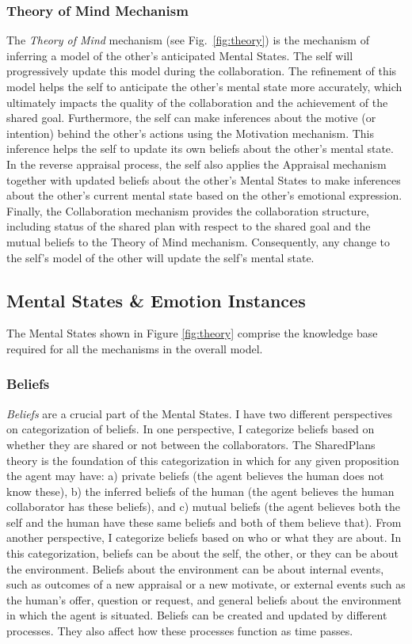 \subsubsection{Theory of Mind Mechanism}

The \textit{Theory of Mind} mechanism (see Fig.~\ref{fig:theory}) is the
mechanism of inferring a model of the other's anticipated Mental States. The
self will progressively update this model during the collaboration. The
refinement of this model helps the self to anticipate the other's mental state
more accurately, which ultimately impacts the quality of the collaboration and
the achievement of the shared goal. Furthermore, the self can make inferences
about the motive (or intention) behind the other's actions using the Motivation
mechanism. This inference helps the self to update its own beliefs about the
other's mental state. In the reverse appraisal process, the self also applies
the Appraisal mechanism together with updated beliefs about the other's Mental
States to make inferences about the other's current mental state based on the
other's emotional expression. Finally, the Collaboration mechanism provides the
collaboration structure, including status of the shared plan with respect to the
shared goal and the mutual beliefs to the Theory of Mind mechanism.
Consequently, any change to the self's model of the other will update the self's
mental state.

\subsection{Mental States \& Emotion Instances}

The Mental States shown in Figure \ref{fig:theory} comprise the knowledge base
required for all the mechanisms in the overall model.

\subsubsection{Beliefs}

\textit{Beliefs} are a crucial part of the Mental States. I have two different
perspectives on categorization of beliefs. In one perspective, I categorize
beliefs based on whether they are shared or not between the collaborators. The
SharedPlans \cite{grosz:plans-discourse} theory is the foundation of this
categorization in which for any given proposition the agent may have: a) private
beliefs (the agent believes the human does not know these), b) the inferred
beliefs of the human (the agent believes the human collaborator has these
beliefs), and c) mutual beliefs (the agent believes both the self and the human
have these same beliefs and both of them believe that). From another
perspective, I categorize beliefs based on who or what they are about. In this
categorization, beliefs can be about the self, the other, or they can be about
the environment. Beliefs about the environment can be about internal events,
such as outcomes of a new appraisal or a new motivate, or external events such
as the human's offer, question or request, and general beliefs about the
environment in which the agent is situated. Beliefs can be created and updated
by different processes. They also affect how these processes function as time
passes.

